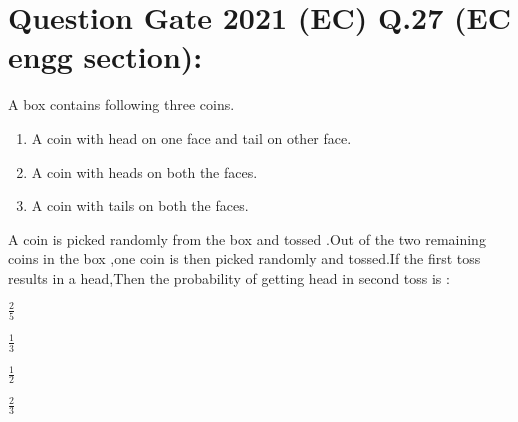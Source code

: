 \documentclass[journal,12pt,twocolumn]{IEEEtran}
\begin{document}
\section*{Question Gate 2021 (EC) Q.27 (EC engg section):}

 A box contains following three coins.
 \begin{enumerate}[label=\Roman*.]
 \item A coin with head on one face and tail on other face.
 \item A coin with heads on both the faces.
 \item A coin with tails on both the faces.
\end{enumerate}
A coin is picked randomly from the box and tossed .Out of the two remaining coins in the box ,one coin is then picked randomly and tossed.If the first toss results in a head,Then the probability of getting head in second toss is :
\begin{enumerate}[(A)]
\begin{multicols}{2}
\item $ \frac{2}{5}$\\
\item $\frac{1}{3}$\\
\item $ \frac{1}{2}$\\
\item $\frac{2}{3}$
\end{multicols}
\end{enumerate}
\end{document}
